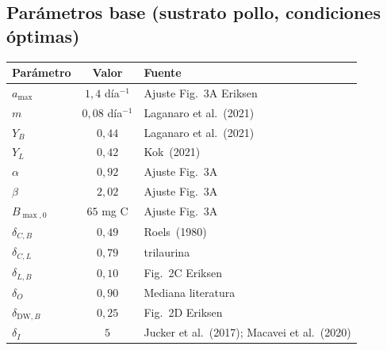 \subsection{Par\'{a}metros base (sustrato pollo, condiciones \'{o}ptimas)}
\begin{center}
\begin{tabular}{lcl}
\toprule
Par\'{a}metro & Valor & Fuente \\
\midrule
$a_{\max}$ & $1{,}4$ d\'{i}a$^{-1}$ & Ajuste Fig.~3A Eriksen \\
$m$ & $0{,}08$ d\'{i}a$^{-1}$ & Laganaro et al.~(2021) \\
$Y_B$ & $0{,}44$ & Laganaro et al.~(2021) \\
$Y_L$ & $0{,}42$ & Kok~(2021) \\
$\alpha$ & $0{,}92$ & Ajuste Fig.~3A \\
$\beta$ & $2{,}02$ & Ajuste Fig.~3A \\
$B_{\max,0}$ & $65$ mg C & Ajuste Fig.~3A \\
$\delta_{C,B}$ & $0{,}49$ & Roels~(1980) \\
$\delta_{C,L}$ & $0{,}79$ & trilaurina \\
$\delta_{L,B}$ & $0{,}10$ & Fig.~2C Eriksen \\
$\delta_O$ & $0{,}90$ & Mediana literatura \\
$\delta_{\text{DW},B}$ & $0{,}25$ & Fig.~2D Eriksen \\
$\delta_I$ & $5$ & Jucker et al.~(2017); Macavei et al.~(2020) \\
\bottomrule
\end{tabular}
\end{center}